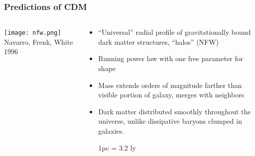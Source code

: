 \documentclass{beamer}
\begin{document}
\frame
{
    \frametitle{Predictions of CDM}

    \fontsize{9}{0.8\baselineskip}
    \begin{columns}

        \begin{column}{0.5\textwidth}
            \begin{center}
                \texttt{[image: nfw.png]}
                \newline
                {\tiny Navarro, Frenk, White 1996}
            \end{center}
        \end{column}

        \begin{column}{0.5\textwidth}    
            \begin{itemize}

                \item  ``Universal'' radial profile of gravitationally bound dark matter
                    structures, ``halos'' {\color{gold} (NFW)}

                        \item Running power law with one free parameter for shape

                        \item Mass extends orders of magnitude farther than visible portion of galaxy,
                            merges with neighbors

                \item  Dark matter distributed smoothly throughout the
                    universe, unlike dissipative baryons clumped in galaxies.

                {\color{gold} {\tiny 1pc = 3.2 ly}}

            \end{itemize}
        \end{column}

    \end{columns}
}
\end{document}
